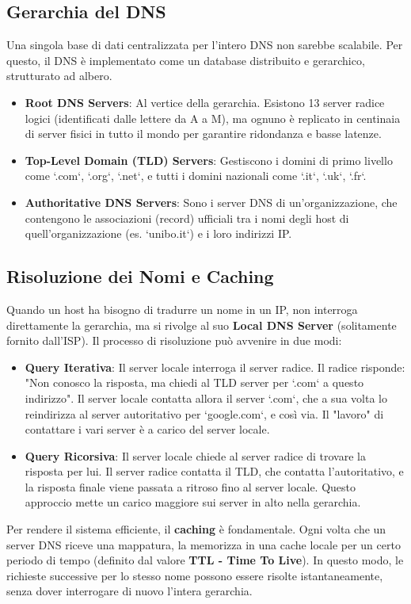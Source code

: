 \subsection{Gerarchia del DNS}
Una singola base di dati centralizzata per l'intero DNS non sarebbe scalabile. Per questo, il DNS è implementato come un database distribuito e gerarchico, strutturato ad albero.
\begin{itemize}
    \item \textbf{Root DNS Servers}: Al vertice della gerarchia. Esistono 13 server radice logici (identificati dalle lettere da A a M), ma ognuno è replicato in centinaia di server fisici in tutto il mondo per garantire ridondanza e basse latenze.
    \item \textbf{Top-Level Domain (TLD) Servers}: Gestiscono i domini di primo livello come `.com`, `.org`, `.net`, e tutti i domini nazionali come `.it`, `.uk`, `.fr`.
    \item \textbf{Authoritative DNS Servers}: Sono i server DNS di un'organizzazione, che contengono le associazioni (record) ufficiali tra i nomi degli host di quell'organizzazione (es. `unibo.it`) e i loro indirizzi IP.
\end{itemize}

\subsection{Risoluzione dei Nomi e Caching}
Quando un host ha bisogno di tradurre un nome in un IP, non interroga direttamente la gerarchia, ma si rivolge al suo \textbf{Local DNS Server} (solitamente fornito dall'ISP).
Il processo di risoluzione può avvenire in due modi:
\begin{itemize}
    \item \textbf{Query Iterativa}: Il server locale interroga il server radice. Il radice risponde: "Non conosco la risposta, ma chiedi al TLD server per `.com` a questo indirizzo". Il server locale contatta allora il server `.com`, che a sua volta lo reindirizza al server autoritativo per `google.com`, e così via. Il "lavoro" di contattare i vari server è a carico del server locale.
    \item \textbf{Query Ricorsiva}: Il server locale chiede al server radice di trovare la risposta per lui. Il server radice contatta il TLD, che contatta l'autoritativo, e la risposta finale viene passata a ritroso fino al server locale. Questo approccio mette un carico maggiore sui server in alto nella gerarchia.
\end{itemize}
Per rendere il sistema efficiente, il \textbf{caching} è fondamentale. Ogni volta che un server DNS riceve una mappatura, la memorizza in una cache locale per un certo periodo di tempo (definito dal valore \textbf{TTL - Time To Live}). In questo modo, le richieste successive per lo stesso nome possono essere risolte istantaneamente, senza dover interrogare di nuovo l'intera gerarchia.

